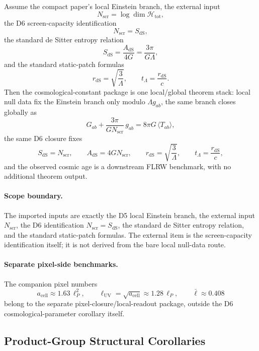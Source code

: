 \begin{theorem}
Assume the compact paper's local Einstein branch, the external input
\[
N_{\mathrm{scr}}=\log \dim \mathcal H_{\mathrm{tot}},
\]
the D6 screen-capacity identification
\[
N_{\mathrm{scr}}=S_{\mathrm{dS}},
\]
\noindent the standard de Sitter entropy relation
\[
S_{\mathrm{dS}}=\frac{A_{\mathrm{dS}}}{4G}=\frac{3\pi}{G\Lambda},
\]
and the standard static-patch formulas
\[
r_{\mathrm{dS}}=\sqrt{\frac{3}{\Lambda}},
\qquad
t_\Lambda=\frac{r_{\mathrm{dS}}}{c}.
\]
Then the cosmological-constant package is one local/global theorem stack: local null data fix the
Einstein branch only modulo \(\Lambda g_{ab}\), the same branch closes globally as
\[
G_{ab}+\frac{3\pi}{G N_{\mathrm{scr}}}\,g_{ab}=8\pi G\,\langle T_{ab}\rangle,
\]
the same D6 closure fixes
\[
S_{\mathrm{dS}}=N_{\mathrm{scr}},
\qquad
A_{\mathrm{dS}}=4G N_{\mathrm{scr}},
\qquad
r_{\mathrm{dS}}=\sqrt{\frac{3}{\Lambda}},
\qquad
t_\Lambda=\frac{r_{\mathrm{dS}}}{c},
\]
and the observed cosmic age is a downstream FLRW benchmark, with no additional theorem
output.
\end{theorem}

\paragraph{Scope boundary.}
The imported inputs are exactly the D5 local Einstein branch, the external input
\(N_{\mathrm{scr}}\), the D6 identification \(N_{\mathrm{scr}}=S_{\mathrm{dS}}\), the standard de
Sitter entropy relation, and the standard static-patch formulas. The external item is the
screen-capacity identification itself; it is not derived from the bare local null-data route.

\paragraph{Separate pixel-side benchmarks.}
The companion pixel numbers
\[
a_{\mathrm{cell}}\approx 1.63\,\ell_P^2,
\qquad
\ell_{\mathrm{UV}}=\sqrt{a_{\mathrm{cell}}}\approx 1.28\,\ell_P,
\qquad
\bar{\ell}\approx 0.408
\]
belong to the separate pixel-closure/local-readout package, outside the D6 cosmological-parameter corollary itself.

\subsection{Product-Group Structural Corollaries}

